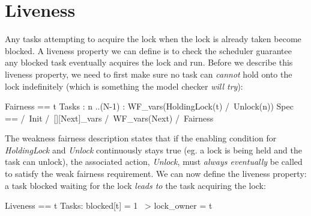 \section{Liveness}

Any tasks attempting to acquire the lock when the lock is already taken become
blocked. A liveness property we can define is to check the scheduler
guarantee any blocked task eventually acquires the lock and run. Before we
describe this liveness property, we need to first make sure no task can
\textit{cannot} hold onto the lock indefinitely (which is something the model
checker \textit{will try}):\newline

\begin{tla}
Fairness ==
    \A t \in Tasks :
        \A n ..(N-1) :
            WF_vars(HoldingLock(t) /\ Unlock(n))
Spec ==
  /\ Init
  /\ [][Next]_vars
  /\ WF_vars(Next)
  /\ Fairness 
\end{tla}
\begin{tlatex}
%
%
%
%
%
%
%
%
%
\end{tlatex}
\newline

The weakness fairness description states that if the enabling condition for
\textit{HoldingLock} and \textit{Unlock} continuously stays true (eg. a lock is
being held and the task can unlock), the associated action, \textit{Unlock},
must \textit{always eventually} be called to satisfy the weak fairness
requirement. We can now define the liveness property: a task blocked waiting
for the lock \textit{leads to} the task acquiring the lock:\newline

\begin{tla}
Liveness == 
    \A t \in Tasks:
        blocked[t] = 1 ~> lock_owner = t
\end{tla}
\begin{tlatex}
%
%
%
\end{tlatex}
\newline
